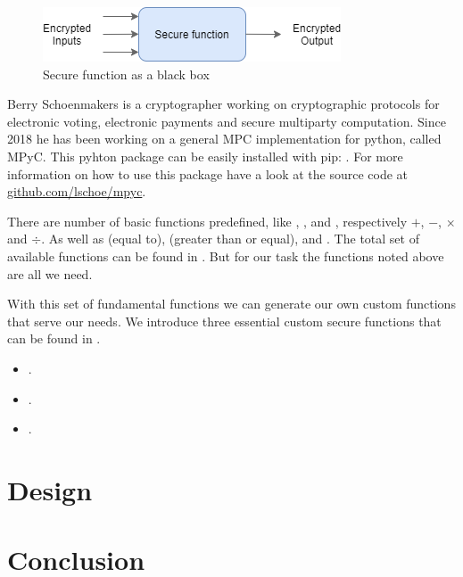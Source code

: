 \begin{figure}[H]
  \includegraphics[scale=0.8]{plots/blackbox.png}
  \centering
  \caption{Secure function as a black box}
  \label{fig:blackbox}
\end{figure}

Berry Schoenmakers is a cryptographer working on cryptographic protocols for electronic voting, electronic payments and secure multiparty computation. Since 2018 he has been working on a general MPC implementation for python, called MPyC. This pyhton package can be easily installed with pip: . For more information on how to use this package have a look at the source code at \url{github.com/lschoe/mpyc}.

There are number of basic functions predefined, like , ,  and , respectively $+$, $-$, $\times$ and $\div$. As well as  (equal to),  (greater than or equal),  and . The total set of available functions can be found in . But for our task the functions noted above are all we need.

With this set of fundamental functions we can generate our own custom functions that serve our needs. We introduce three essential custom secure functions that can be found in .

\begin{itemize}
  \item {}.
  \item {}.
  \item {}.
\end{itemize}


\section{Design}
\label{Design}


\section{Conclusion}
